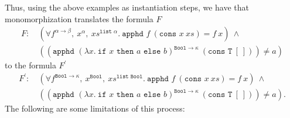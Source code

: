 \documentclass{article}
\begin{document}
	Thus, using the above examples as 
	instantiation steps, we have that 
	monomorphization translates the formula $F$
	\begin{align*}
	F:\ &(\forall f^{\alpha \to \beta},\ 
	x^{\alpha},\ xs^{\texttt{list }\alpha}.\ 
	\texttt{apphd }f\ (\texttt{cons }x
	\ xs) = f\ x)\ \land\ \\
	&((\texttt{apphd }(\lambda x.\ 
	\texttt{if }x \texttt{ then }a 
	\texttt{ else } b)^{\texttt{Bool} 
		\to \kappa}\ (\texttt{cons T}\ [\ ])) 
	\neq a)
	\end{align*}
	to the formula $F^{\prime}$
	\begin{align*}
	F^{\prime}:\ &(\forall 
	f^{\texttt{Bool} \to \kappa},\ 
	x^{\texttt{Bool}},\ 
	xs^{\texttt{list Bool}}.\ 
	\texttt{apphd }f\ (\texttt{cons }x
	\ xs) = f\ x) \ \land\ \\
	&((\texttt{apphd } (\lambda x.\ 
	\texttt{if }x \texttt{ then }a 
	\texttt{ else } b)^{\texttt{Bool} 
		\to \kappa}\ (\texttt{cons T}\ 
	[\ ])) \neq a).
	\end{align*}
	\noindent The following are some 
	limitations of this process:
\end{document}
